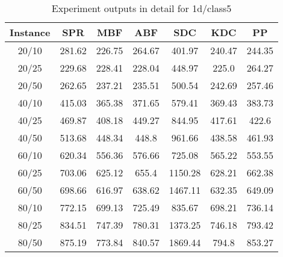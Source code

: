 \begin{table}[ht!]
    \caption{Experiment outputs in detail for 1d/class5}
    \centering
    \begin{tabular}{@{}ccccccc@{}}
        \toprule
        {\bfseries Instance} & {\bfseries SPR} & {\bfseries MBF}
        & {\bfseries ABF} & {\bfseries SDC} & {\bfseries KDC} & {\bfseries PP}\\
        \midrule
        20/10 & 281.62 & 226.75 & 264.67 & 401.97 & 240.47 & 244.35\\
        20/25 & 229.68 & 228.41 & 228.04 & 448.97 & 225.0 & 264.27\\
        20/50 & 262.65 & 237.21 & 235.51 & 500.54 & 242.69 & 257.46\\
        40/10 & 415.03 & 365.38 & 371.65 & 579.41 & 369.43 & 383.73\\
        40/25 & 469.87 & 408.18 & 449.27 & 844.95 & 417.61 & 422.6\\
        40/50 & 513.68 & 448.34 & 448.8 & 961.66 & 438.58 & 461.93\\
        60/10 & 620.34 & 556.36 & 576.66 & 725.08 & 565.22 & 553.55\\
        60/25 & 703.06 & 625.12 & 655.4 & 1150.28 & 628.21 & 662.38\\
        60/50 & 698.66 & 616.97 & 638.62 & 1467.11 & 632.35 & 649.09\\
        80/10 & 772.15 & 699.13 & 725.49 & 835.67 & 698.21 & 736.14\\
        80/25 & 834.51 & 747.39 & 780.31 & 1373.25 & 746.18 & 793.42\\
        80/50 & 875.19 & 773.84 & 840.57 & 1869.44 & 794.8 & 853.27\\
        \bottomrule
    \end{tabular}
\end{table}